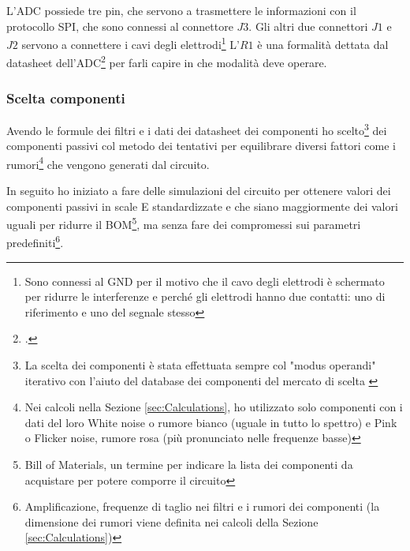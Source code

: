 \documentclass[a4paper, 10pt, final]{article} %
\begin{document}
    L'ADC possiede tre pin, che servono a trasmettere le informazioni con il protocollo SPI, che sono connessi al connettore $J3$.
    Gli altri due connettori $J1$ e $J2$ servono a connettere i cavi degli elettrodi\footnote{Sono connessi al GND per il motivo che il cavo degli elettrodi \`{e} schermato per ridurre le interferenze e perch\'{e} gli elettrodi hanno due contatti: uno di riferimento e uno del segnale stesso}
    L'$R1$ \`{e} una formalit\`{a} dettata dal datasheet dell'ADC\footcite[p5,p21]{TLV2541:Datasheet} per farli capire in che modalit\`{a} deve operare.

    \subsubsection{Scelta componenti}
    Avendo le formule dei filtri e i dati dei datasheet dei componenti ho scelto\footnote{La scelta dei componenti \`{e} stata effettuata sempre col "modus operandi" iterativo con l'aiuto del database dei componenti del mercato di scelta \parencite[]{Mouser:Web}} dei componenti passivi col metodo dei tentativi per equilibrare diversi fattori come i rumori\footnote{Nei calcoli nella Sezione \ref{sec:Calculations}, ho utilizzato solo componenti con i dati del loro White noise o rumore bianco (uguale in tutto lo spettro) e Pink o Flicker noise, rumore rosa (pi\`{u} pronunciato nelle frequenze basse)} che vengono generati dal circuito.

    In seguito ho iniziato a fare delle simulazioni del circuito per ottenere valori dei componenti passivi in scale E standardizzate e che siano maggiormente dei valori uguali per ridurre il BOM\footnote{Bill of Materials, un termine per indicare la lista dei componenti da acquistare per potere comporre il circuito}, ma senza fare dei compromessi sui parametri predefiniti\footnote{Amplificazione, frequenze di taglio nei filtri e i rumori dei componenti (la dimensione dei rumori viene definita nei calcoli della Sezione \ref{sec:Calculations})}.
\end{document}
